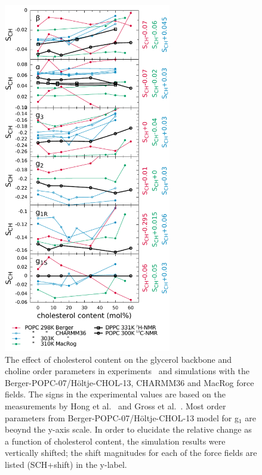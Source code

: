 \documentclass[journal=jpcbfk,manuscript=article]{achemso}
\begin{document}
\begin{figure}[]
  \centering
  \includegraphics[width=7.3cm]{../DATAreportediINblog/cholesterolization_lp.pdf}
  \caption{\label{ordPchol}
    The effect of cholesterol content on the glycerol backbone and choline order parameters in experiments~\cite{brown78,ferreira13} and simulations
    with the Berger-POPC-07/H\"oltje-CHOL-13, CHARMM36 and MacRog force fields. The signs in the experimental values are based on the measurements by Hong et al.~\cite{hong95a,hong95b} 
    and Gross et al.~\cite{gross97}.  Most order parameters from Berger-POPC-07/H\"oltje-CHOL-13 model for g$_1$ are beoynd the y-axis scale.
    In order to elucidate the relative change as a function of cholesterol content, the simulation results were vertically shifted; 
    the shift magnitudes for each of the force fields are listed (SCH+shift) in the y-label.
}
\end{figure}
\end{document}
